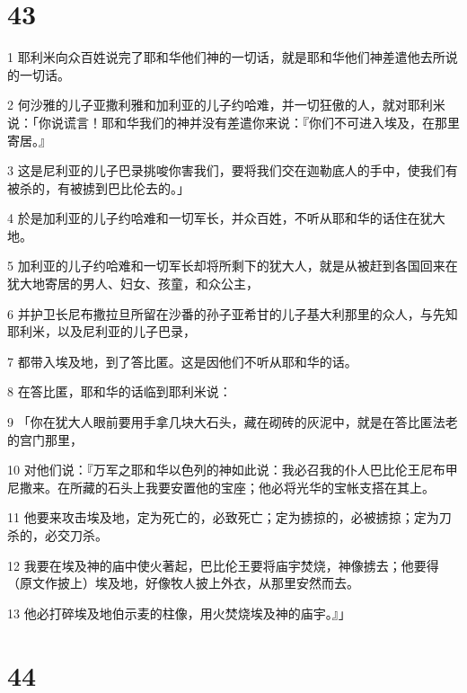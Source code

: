 \chapter{43}

\par 1 耶利米向众百姓说完了耶和华他们神的一切话，就是耶和华他们神差遣他去所说的一切话。
\par 2 何沙雅的儿子亚撒利雅和加利亚的儿子约哈难，并一切狂傲的人，就对耶利米说：「你说谎言！耶和华我们的神并没有差遣你来说：『你们不可进入埃及，在那里寄居。』
\par 3 这是尼利亚的儿子巴录挑唆你害我们，要将我们交在迦勒底人的手中，使我们有被杀的，有被掳到巴比伦去的。」
\par 4 於是加利亚的儿子约哈难和一切军长，并众百姓，不听从耶和华的话住在犹大地。
\par 5 加利亚的儿子约哈难和一切军长却将所剩下的犹大人，就是从被赶到各国回来在犹大地寄居的男人、妇女、孩童，和众公主，
\par 6 并护卫长尼布撒拉旦所留在沙番的孙子亚希甘的儿子基大利那里的众人，与先知耶利米，以及尼利亚的儿子巴录，
\par 7 都带入埃及地，到了答比匿。这是因他们不听从耶和华的话。
\par 8 在答比匿，耶和华的话临到耶利米说：
\par 9 「你在犹大人眼前要用手拿几块大石头，藏在砌砖的灰泥中，就是在答比匿法老的宫门那里，
\par 10 对他们说：『万军之耶和华以色列的神如此说：我必召我的仆人巴比伦王尼布甲尼撒来。在所藏的石头上我要安置他的宝座；他必将光华的宝帐支搭在其上。
\par 11 他要来攻击埃及地，定为死亡的，必致死亡；定为掳掠的，必被掳掠；定为刀杀的，必交刀杀。
\par 12 我要在埃及神的庙中使火著起，巴比伦王要将庙宇焚烧，神像掳去；他要得（原文作披上）埃及地，好像牧人披上外衣，从那里安然而去。
\par 13 他必打碎埃及地伯示麦的柱像，用火焚烧埃及神的庙宇。』」

\chapter{44}

